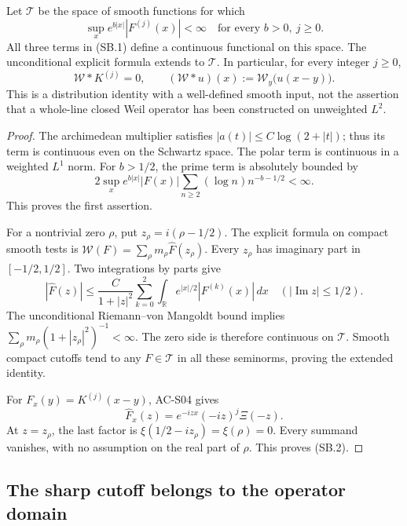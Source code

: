 \begin{lemma}
\label{AC-S22}
Let \(\mathcal T\) be the space of smooth functions for which
\[
 \sup_x e^{b|x|}|F^{(j)}(x)|<\infty
 \quad\text{for every }b>0,\ j\geq0.
\]
All three terms in (SB.1) define a continuous functional on this
space.  The unconditional explicit formula extends to \(\mathcal T\).
In particular, for every integer \(j\geq0\),
\[
 \mathcal W*K^{(j)}=0, \qquad
 (\mathcal W*u)(x):=\mathcal W_y\bigl(u(x-y)\bigr).
                                                               \tag{SB.2}
\]
This is a distribution identity with a well-defined smooth input,
not the assertion that a whole-line closed Weil operator has been
constructed on unweighted \(L^2\).
\end{lemma}
\begin{proof}
The archimedean multiplier satisfies
\(|a(t)|\leq C\log(2+|t|)\); thus its term is continuous even on
the Schwartz space.  The polar term is continuous in a weighted
\(L^1\) norm.  For \(b>1/2\), the prime term is absolutely bounded by
\[
 2\sup_x e^{b|x|}|F(x)|
       \sum_{n\geq2}(\log n)n^{-b-1/2}<\infty.
\]
This proves the first assertion.

For a nontrivial zero \(\rho\), put \(z_\rho=i(\rho-1/2)\).
The explicit formula on compact smooth tests is
\(\mathcal W(F)=\sum_\rho m_\rho\widehat F(z_\rho)\).
Every \(z_\rho\) has imaginary part in \([-1/2,1/2]\).
Two integrations by parts give
\[
 |\widehat F(z)|
 \leq \frac{C}{1+|z|^2}
       \sum_{k=0}^2\int_{\mathbb R}
                       e^{|x|/2}|F^{(k)}(x)|\,dx
 \quad(|\operatorname{Im}z|\leq1/2).
\]
The unconditional Riemann--von Mangoldt bound implies
\(\sum_\rho m_\rho(1+|z_\rho|^2)^{-1}<\infty\).
The zero side is therefore continuous on \(\mathcal T\).
Smooth compact cutoffs tend to any \(F\in\mathcal T\) in all these
seminorms, proving the extended identity.

For \(F_x(y)=K^{(j)}(x-y)\), AC-S04 gives
\[
 \widehat F_x(z)=e^{-izx}(-iz)^j\Xi(-z).
\]
At \(z=z_\rho\), the last factor is
\(\xi(1/2-iz_\rho)=\xi(\rho)=0\).
Every summand vanishes, with no assumption on the real part of
\(\rho\).  This proves (SB.2).
\end{proof}

\subsection{The sharp cutoff belongs to the operator domain}

